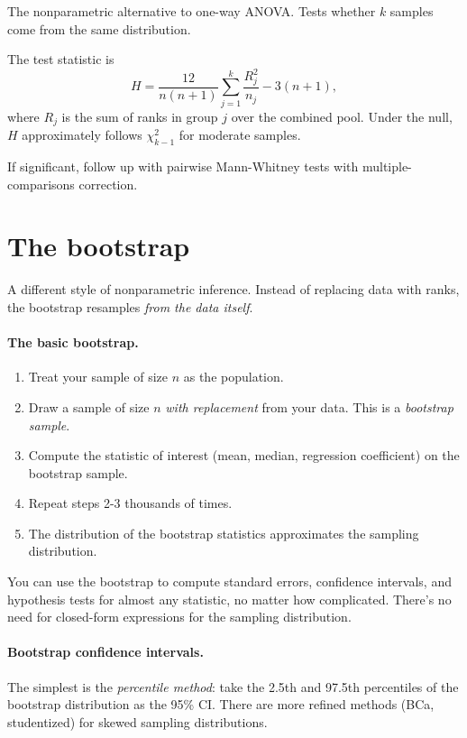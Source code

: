 The nonparametric alternative to one-way ANOVA. Tests whether $k$ samples come from the same distribution.

The test statistic is
\begin{equation}
  H = \frac{12}{n(n+1)} \sum_{j=1}^{k}\frac{R_j^2}{n_j} - 3(n+1),
\end{equation}
where $R_j$ is the sum of ranks in group $j$ over the combined pool. Under the null, $H$ approximately follows $\chi^2_{k-1}$ for moderate samples.

If significant, follow up with pairwise Mann-Whitney tests with multiple-comparisons correction.

\section{The bootstrap}

A different style of nonparametric inference. Instead of replacing data with ranks, the bootstrap resamples \emph{from the data itself}.

\paragraph{The basic bootstrap.}
\begin{enumerate}[noitemsep]
  \item Treat your sample of size $n$ as the population.
  \item Draw a sample of size $n$ \emph{with replacement} from your data. This is a \emph{bootstrap sample}.
  \item Compute the statistic of interest (mean, median, regression coefficient) on the bootstrap sample.
  \item Repeat steps 2-3 thousands of times.
  \item The distribution of the bootstrap statistics approximates the sampling distribution.
\end{enumerate}

You can use the bootstrap to compute standard errors, confidence intervals, and hypothesis tests for almost any statistic, no matter how complicated. There's no need for closed-form expressions for the sampling distribution.

\paragraph{Bootstrap confidence intervals.} The simplest is the \emph{percentile method}: take the 2.5th and 97.5th percentiles of the bootstrap distribution as the 95\% CI. There are more refined methods (BCa, studentized) for skewed sampling distributions.

